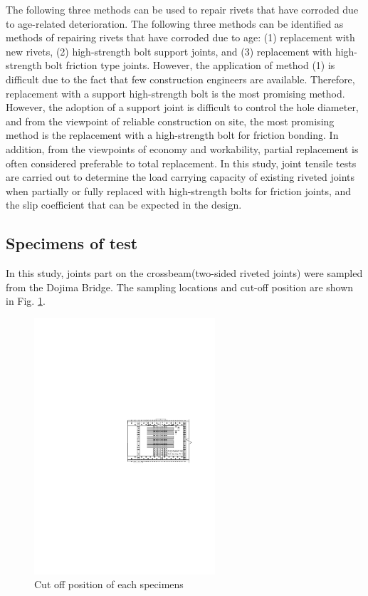 The following three methods can be used to repair rivets that have corroded due to age-related deterioration. The following three methods can be identified as methods of repairing rivets that have corroded due to age: (1) replacement with new rivets, (2) high-strength bolt support joints, and (3) replacement with high-strength bolt friction type joints. However, the application of method (1) is difficult due to the fact that few construction engineers are available. Therefore, replacement with a support high-strength bolt is the most promising method. However, the adoption of a support joint is difficult to control the hole diameter, and from the viewpoint of reliable construction on site, the most promising method is the replacement with a high-strength bolt for friction bonding. In addition, from the viewpoints of economy and workability, partial replacement is often considered preferable to total replacement. In this study, joint tensile tests are carried out to determine the load carrying capacity of existing riveted joints when partially or fully replaced with high-strength bolts for friction joints, and the slip coefficient that can be expected in the design.


\subsection{Specimens of test}

In this study, joints part on the crossbeam(two-sided riveted joints) were sampled from the Dojima Bridge. The sampling locations and cut-off position are shown in Fig. \ref{fig-cutoff}.

\begin{figure}[htbp]
    \centering
    \includegraphics[width=0.6\textwidth]{imgs/ch4/figA1.pdf}
    \caption{Cut off position of each specimens}
    \label{fig-cutoff}
\end{figure}

